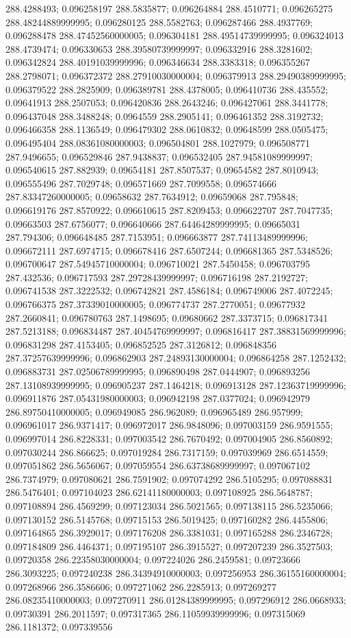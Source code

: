 288.4288493; 0.096258197 288.5835877; 0.096264884 288.4510771; 0.096265275 288.48244889999995; 0.096280125 288.5582763; 0.096287466 288.4937769; 0.096288478 288.47452560000005; 0.096304181 288.49514739999995; 0.096324013 288.4739474; 0.096330653 288.39580739999997; 0.096332916 288.3281602; 0.096342824 288.40191039999996; 0.096346634 288.3383318; 0.096355267 288.2798071; 0.096372372 288.27910030000004; 0.096379913 288.29490389999995; 0.096379522 288.2825909; 0.096389781 288.4378005; 0.096410736 288.435552; 0.09641913 288.2507053; 0.096420836 288.2643246; 0.096427061 288.3441778; 0.096437048 288.3488248; 0.0964559 288.2905141; 0.096461352 288.3192732; 0.096466358 288.1136549; 0.096479302 288.0610832; 0.09648599 288.0505475; 0.096495404 288.08361080000003; 0.096504801 288.1027979; 0.096508771 287.9496655; 0.096529846 287.9438837; 0.096532405 287.94581089999997; 0.096540615 287.882939; 0.09654181 287.8507537; 0.09654582 287.8010943; 0.096555496 287.7029748; 0.096571669 287.7099558; 0.096574666 287.83347260000005; 0.09658632 287.7634912; 0.09659068 287.795848; 0.096619176 287.8570922; 0.096610615 287.8209453; 0.096622707 287.7047735; 0.09663503 287.6756077; 0.096640666 287.64464289999995; 0.09665031 287.794306; 0.096648485 287.7153951; 0.096663877 287.74113489999996; 0.096672111 287.6974715; 0.096678416 287.6507244; 0.096681365 287.5348526; 0.096700647 287.54945710000004; 0.096710021 287.5450458; 0.096703795 287.432536; 0.096717593 287.29728439999997; 0.096716198 287.2192727; 0.096741538 287.3222532; 0.096742821 287.4586184; 0.096749006 287.4072245; 0.096766375 287.37339010000005; 0.096774737 287.2770051; 0.09677932 287.2660841; 0.096780763 287.1498695; 0.09680662 287.3373715; 0.096817341 287.5213188; 0.096834487 287.40454769999997; 0.096816417 287.38831569999996; 0.096831298 287.4153405; 0.096852525 287.3126812; 0.096848356 287.37257639999996; 0.096862903 287.24893130000004; 0.096864258 287.1252432; 0.096883731 287.02506789999995; 0.096890498 287.0444907; 0.096893256 287.13108939999995; 0.096905237 287.1464218; 0.096913128 287.12363719999996; 0.096911876 287.05431980000003; 0.096942198 287.0377024; 0.096942979 286.89750410000005; 0.096949085 286.962089; 0.096965489 286.957999; 0.096961017 286.9371417; 0.096972017 286.9848096; 0.097003159 286.9591555; 0.096997014 286.8228331; 0.097003542 286.7670492; 0.097004905 286.8560892; 0.097030244 286.866625; 0.097019284 286.7317159; 0.097039969 286.6514559; 0.097051862 286.5656067; 0.097059554 286.63738689999997; 0.097067102 286.7374979; 0.097080621 286.7591902; 0.097074292 286.5105295; 0.097088831 286.5476401; 0.097104023 286.62141180000003; 0.097108925 286.5648787; 0.097108894 286.4569299; 0.097123034 286.5021565; 0.097138115 286.5235066; 0.097130152 286.5145768; 0.09715153 286.5019425; 0.097160282 286.4455806; 0.097164865 286.3929017; 0.097176208 286.3381031; 0.097165288 286.2346728; 0.097184809 286.4464371; 0.097195107 286.3915527; 0.097207239 286.3527503; 0.09720358 286.22358030000004; 0.097224026 286.2459581; 0.09723666 286.3093225; 0.097240238 286.34394910000003; 0.097256953 286.36155160000004; 0.097268966 286.3586606; 0.097271062 286.2285913; 0.097269277 286.08235410000003; 0.097270911 286.01284389999995; 0.097296912 286.0668933; 0.09730391 286.2011597; 0.097317365 286.11059939999996; 0.097315069 286.1181372; 0.097339556 